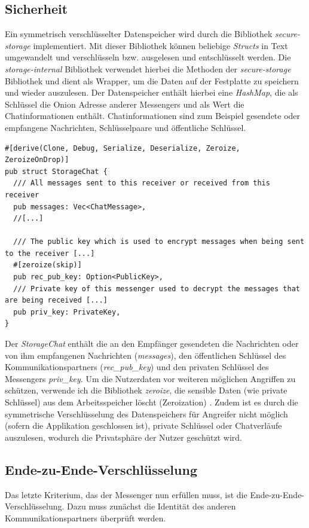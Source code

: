 \documentclass[a4paper,ngerman, headheight=28pt,12pt]{scrartcl}
\newcommand{\vcite}[1]{\cite[vgl.][]{#1}}
\begin{document}
\subsection{Sicherheit}
Ein symmetrisch verschlüsselter Datenspeicher wird durch die Bibliothek \textit{secure-storage} implementiert. Mit dieser Bibliothek können beliebige \textit{Structs} in Text umgewandelt und verschlüsseln bzw. ausgelesen und entschlüsselt werden. Die \textit{storage-internal} Bibliothek verwendet hierbei die Methoden der \textit{secure-storage} Bibliothek und dient als Wrapper, um die Daten auf der Festplatte zu speichern und wieder auszulesen. Der Datenspeicher enthält hierbei eine \textit{HashMap}, die als Schlüssel die Onion Adresse anderer Messengers und als Wert die Chatinformationen enthält. Chatinformationen sind zum Beispiel gesendete oder empfangene Nachrichten, Schlüsselpaare und öffentliche Schlüssel.
\begin{verbatim}
#[derive(Clone, Debug, Serialize, Deserialize, Zeroize, ZeroizeOnDrop)]
pub struct StorageChat {
  /// All messages sent to this receiver or received from this receiver
  pub messages: Vec<ChatMessage>,
  //[...]

  /// The public key which is used to encrypt messages when being sent to the receiver [...]
  #[zeroize(skip)]
  pub rec_pub_key: Option<PublicKey>,
  /// Private key of this messenger used to decrypt the messages that are being received [...]
  pub priv_key: PrivateKey,
}
\end{verbatim}
Der \textit{StorageChat} enthält die an den Empfänger gesendeten die Nachrichten oder von ihm empfangenen Nachrichten (\textit{messages}), den öffentlichen Schlüssel des Kommunikationspartners (\textit{rec\_pub\_key}) und den privaten Schlüssel des Messengers \textit{priv\_key}.
Um die Nutzerdaten vor weiteren möglichen Angriffen zu schützen, verwende ich die Bibliothek \textit{zeroize}, die sensible Daten (wie private Schlüssel) aus dem Arbeitsspeicher löscht (Zeroization) \vcite{Zeroization}. Zudem ist es durch die symmetrische Verschlüsselung des Datenspeichers für Angreifer nicht möglich (sofern die Applikation geschlossen ist), private Schlüssel oder Chatverläufe auszulesen, wodurch die Privatsphäre der Nutzer geschützt wird.

\subsection{Ende-zu-Ende-Verschlüsselung}
Das letzte Kriterium, das der Messenger nun erfüllen muss, ist die Ende-zu-Ende-Verschlüsselung. Dazu muss zunächst die Identität des anderen Kommunikationspartners überprüft werden.
\end{document}
